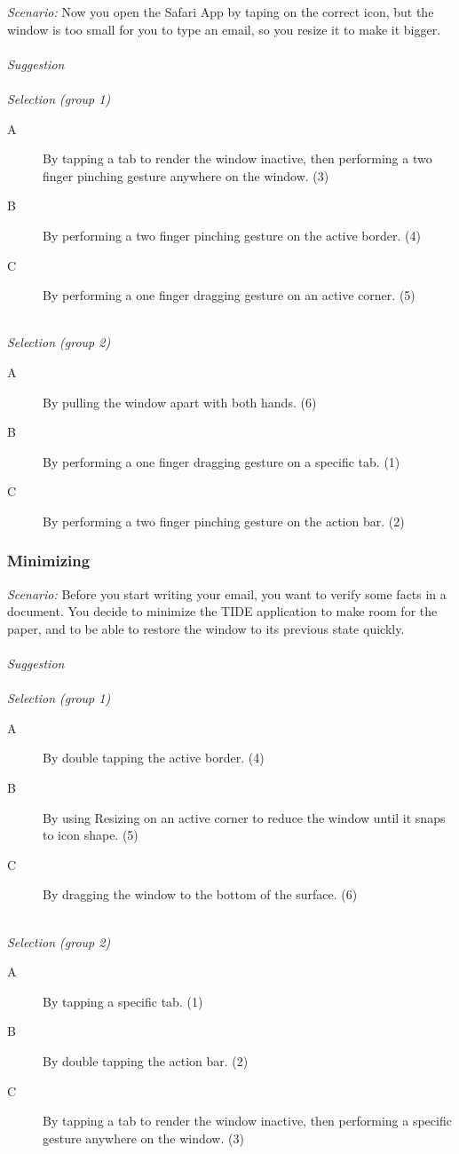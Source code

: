 \emph{Scenario:}
Now you open the Safari App by taping on the correct icon, but the window is too small for you to type an email, so you resize it to make it bigger.
\hfill\\
\hfill\\
\emph{Suggestion}
\hfill\\
\hfill\\
\emph{Selection (group 1)}
\begin{description}
\item[A]{By tapping a tab to render the window inactive, then performing a two finger pinching gesture anywhere on the window. (3)}
\item[B]{By performing a two finger pinching gesture on the active border. (4)}
\item[C]{By performing a one finger dragging gesture on an active corner. (5)}
\end{description}
\hfill\\
\emph{Selection (group 2)}
\begin{description}
\item[A]{By pulling the window apart with both hands. (6)}
\item[B]{By performing a one finger dragging gesture on a specific tab. (1)}
\item[C]{By performing a two finger pinching gesture on the action bar. (2)}
\end{description}



\subsubsection{Minimizing}

\emph{Scenario:}
Before you start writing your email, you want to verify some facts in a document.
You decide to minimize the TIDE application to make room for the paper, and to be able to restore the window to its previous state quickly.
\hfill\\
\hfill\\
\emph{Suggestion}
\hfill\\
\hfill\\
\emph{Selection (group 1)}
\begin{description}
\item[A]{By double tapping the active border. (4)}
\item[B]{By using Resizing on an active corner to reduce the window until it snaps to icon shape. (5)}
\item[C]{By dragging the window to the bottom of the surface. (6)}
\end{description}
\hfill\\
\emph{Selection (group 2)}
\begin{description}
\item[A]{By tapping a specific tab. (1)}
\item[B]{By double tapping the action bar. (2)}
\item[C]{By tapping a tab to render the window inactive, then performing a specific gesture anywhere on the window. (3)}
\end{description}

